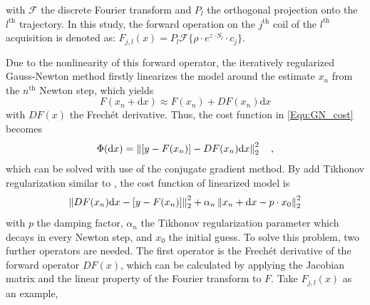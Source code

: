 with $\mathcal{F}$ the discrete Fourier transform and $P_l$ the orthogonal projection onto the $l^{\text{th}}$ trajectory. In this study, the forward operation on the $j^{\text{th}}$ coil of the $l^{\text{th}}$ acquisition is denoted as: $F_{j,l}(x) = P_l \mathcal{F} \{\rho \cdot e^{z \cdot S_l} \cdot c_j \}$.

Due to the nonlinearity of this forward operator, the iteratively regularized Gauss-Newton method \cite{1996_regu_inv,2004_iter_inv} firstly linearizes the model around the estimate $x_n$ from the $n^{\text{th}}$ Newton step, which yields 
\begin{equation}
  F(x_n + \text{d}x) \approx F(x_n) + DF(x_n) \text{d}x
\end{equation} 
with $DF(x)$ the Frech\'et derivative. Thus, the cost function in \cref{Equ:GN_cost} becomes 
\begin{equation}
  \Phi(\text{d}x) = \left\lVert[y-F(x_n)] - DF(x_n) \text{d}x\right\rVert_2^2 \quad ,
\end{equation}
which can be solved with use of the conjugate gradient method. By add Tikhonov regularization similar to \cite{2008_NLINV,2010_NLINV_Heart}, the cost function of linearized model is
\begin{equation} \label{Equ:CG_cost}
  \left\lVert DF(x_n) \text{d}x-[y-F(x_n)]\right\rVert_2^2 + \alpha_n \left\lVert x_n + \text{d}x - p \cdot x_0\right\rVert_2^2
\end{equation}
with $p$ the damping factor, $\alpha_n$ the Tikhonov regularization parameter which decays in every Newton step, and $x_0$ the initial guess. To solve this problem, two further operators are needed. The first operator is the Frech\'et derivative of the forward operator $DF(x)$, which can be calculated by applying the Jacobian matrix and the linear property of the Fourier transform to $F$. Take $F_{j,l}(x)$ as an example, 
